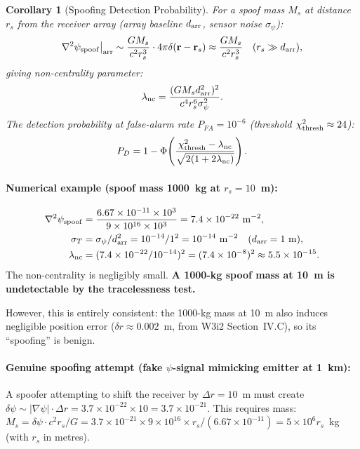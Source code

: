 \documentclass[aps,prd,twocolumn,superscriptaddress,nofootinbib]{revtex4-2}
\newtheorem{corollary}[theorem]{Corollary}
\begin{document}
\begin{corollary}[Spoofing Detection Probability]
\label{cor:spoof-pd}
For a spoof mass $M_s$ at distance $r_s$ from the receiver array
(array baseline $d_{\rm arr}$, sensor noise $\sigma_\psi$):
\begin{equation}
  \nabla^2\psi_{\rm spoof}\big|_{\rm arr}
  \sim \frac{GM_s}{c^2 r_s^3} \cdot 4\pi\delta(\mathbf{r}-\mathbf{r}_s)
  \approx \frac{GM_s}{c^2 r_s^3}
  \quad (r_s \gg d_{\rm arr}),
  \label{eq:laplacian-spoof}
\end{equation}
giving non-centrality parameter:
\begin{equation}
  \lambda_{\rm nc} = \frac{(GM_s d_{\rm arr}^2)^2}{c^4 r_s^6 \sigma_\psi^2}.
  \label{eq:nc-param}
\end{equation}
The detection probability at false-alarm rate $P_{FA} = 10^{-6}$
(threshold $\chi^2_{{\rm thresh}} \approx 24$):
\begin{equation}
  P_D = 1 - \Phi\!\left(\frac{\chi^2_{\rm thresh} - \lambda_{\rm nc}}
  {\sqrt{2(1 + 2\lambda_{\rm nc})}}\right).
  \label{eq:pd-formula}
\end{equation}
\end{corollary}

\paragraph{Numerical example (spoof mass 1000~kg at $r_s = 10$~m):}
\begin{align}
  \nabla^2\psi_{\rm spoof} &= \frac{6.67\times10^{-11}\times10^3}
  {9\times10^{16}\times10^3}
  = 7.4\times10^{-22}~\mathrm{m}^{-2}, \\
  \sigma_T &= \sigma_\psi/d_{\rm arr}^2
  = 10^{-14}/1^2 = 10^{-14}~\mathrm{m}^{-2} \quad (d_{\rm arr}=1~\mathrm{m}), \\
  \lambda_{\rm nc} &= (7.4\times10^{-22}/10^{-14})^2
  = (7.4\times10^{-8})^2 \approx 5.5\times10^{-15}.
\end{align}
The non-centrality is negligibly small.  \textbf{A 1000-kg spoof mass
at 10~m is undetectable by the tracelessness test.}

However, this is entirely consistent: the 1000-kg mass at 10~m also
induces negligible position error ($\delta r \approx 0.002$~m,
from W3i2 Section~IV.C), so its ``spoofing'' is benign.

\paragraph{Genuine spoofing attempt (fake $\psi$-signal mimicking emitter
at 1~km):}
A spoofer attempting to shift the receiver by $\Delta r = 10$~m must
create $\delta\psi \sim |\nabla\psi|\cdot\Delta r
= 3.7\times10^{-22}\times10 = 3.7\times10^{-21}$.
This requires mass:
$M_s = \delta\psi \cdot c^2 r_s / G
= 3.7\times10^{-21}\times9\times10^{16}\times r_s/(6.67\times10^{-11})
= 5\times10^6 r_s$~kg (with $r_s$ in metres).
\end{document}
